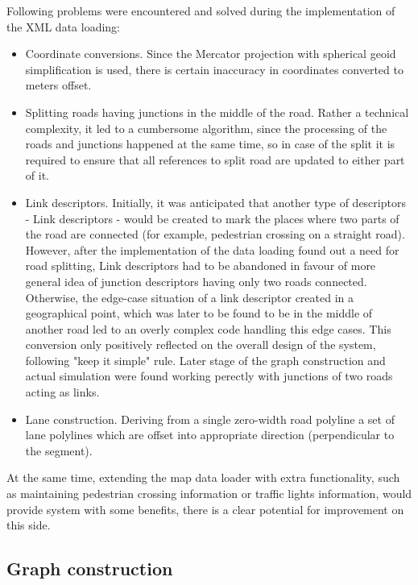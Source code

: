 Following problems were encountered and solved during the implementation of the XML data loading:
\begin{itemize}
    \item Coordinate conversions. Since the Mercator projection with spherical geoid simplification is used, there is certain inaccuracy in coordinates converted to meters offset.
    \item Splitting roads having junctions in the middle of the road. Rather a technical complexity, it led to a cumbersome algorithm, since the processing of the roads and junctions happened at the same time, so in case of the split it is required to ensure that all references to split road are updated to either part of it.
    \item Link descriptors. Initially, it was anticipated that another type of descriptors - Link descriptors - would be created to mark the places where two parts of the road are connected (for example, pedestrian crossing on a straight road). However, after the implementation of the data loading found out a need for road splitting, Link descriptors had to be abandoned in favour of more general idea of junction descriptors having only two roads connected. Otherwise, the edge-case situation of a link descriptor created in a geographical point, which was later to be found to be in the middle of another road led to an overly complex code handling this edge cases. This conversion only positively reflected on the overall design of the system, following "keep it simple" rule. Later stage of the graph construction and actual simulation were found working perectly with junctions of two roads acting as links.
    \item Lane construction. Deriving from a single zero-width road polyline a set of lane polylines which are offset into appropriate direction (perpendicular to the segment).
\end{itemize}

At the same time, extending the map data loader with extra functionality, such as maintaining pedestrian crossing information or traffic lights information, would provide system with some benefits, there is a clear potential for improvement on this side.

\subsection{Graph construction}

